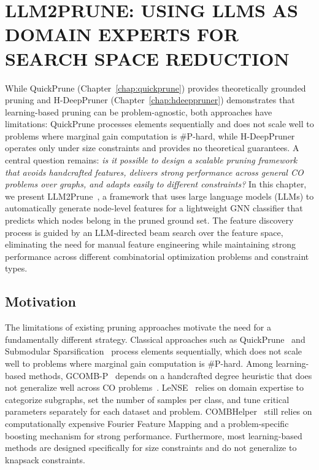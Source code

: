 \pagestyle{plain} %

\chapter{\uppercase {LLM2Prune: Using LLMs as Domain Experts for Search Space Reduction}} \label{chap:llm2prune}

While QuickPrune (Chapter~\ref{chap:quickprune}) provides theoretically grounded pruning and H-DeepPruner
(Chapter~\ref{chap:hdeeppruner}) demonstrates that learning-based pruning can be problem-agnostic, both
approaches have limitations: QuickPrune processes elements sequentially and does not
scale well to problems where marginal gain computation is \#P-hard, while H-DeepPruner
operates only under size constraints and provides no theoretical guarantees.
A central question remains: \emph{is it possible to design a scalable pruning framework
that avoids handcrafted features, delivers strong performance across general CO problems
over graphs, and adapts easily to different constraints?} In this chapter, we present
LLM2Prune~\citep{nath2026llmprune}, a framework that uses large language models (LLMs) to automatically generate
node-level features for a lightweight GNN classifier that predicts which nodes belong in
the pruned ground set. The feature discovery process is guided by an LLM-directed beam
search over the feature space, eliminating the need for manual feature engineering while
maintaining strong performance across different combinatorial optimization problems and
constraint types.

\section{Motivation}

The limitations of existing pruning approaches motivate the need for a fundamentally
different strategy. Classical approaches such as QuickPrune~\citep{pmlr-v258-nath25a} and
Submodular Sparsification~\citep{zhou2017scaling} process elements sequentially, which
does not scale well to problems where marginal gain computation is \#P-hard. Among learning-based methods,
GCOMB-P~\citep{manchanda2020gcomb} depends on a handcrafted degree heuristic that does not
generalize well across CO problems~\citep{ireland2022lense}.
LeNSE~\citep{ireland2022lense} relies on domain expertise to categorize subgraphs, set the
number of samples per class, and tune critical parameters separately for each dataset and
problem. COMBHelper~\citep{tian2024combhelper} still relies on computationally expensive
Fourier Feature Mapping and a problem-specific boosting mechanism for strong performance.
Furthermore, most learning-based methods are designed specifically for size constraints and
do not generalize to knapsack constraints.

